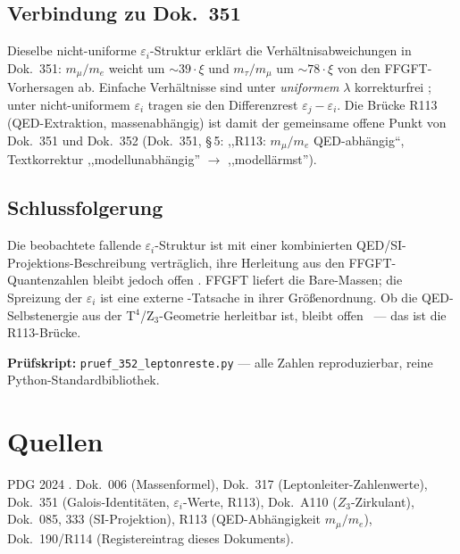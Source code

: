\subsection*{Verbindung zu Dok.~351}

Dieselbe nicht-uniforme $\varepsilon_i$-Struktur erklärt die Verhältnisabweichungen
in Dok.~351: $m_\mu/m_e$ weicht um $\sim 39\cdot\xi$ und $m_\tau/m_\mu$ um $\sim 78\cdot\xi$
von den FFGFT-Vorhersagen ab. Einfache Verhältnisse sind unter \emph{uniformem}
$\lambda$ korrekturfrei \BM; unter nicht-uniformem $\varepsilon_i$ tragen sie
den Differenzrest $\varepsilon_j - \varepsilon_i$. Die Brücke R113 (QED-Extraktion,
massenabhängig) ist damit der gemeinsame offene Punkt von Dok.~351 und Dok.~352
(Dok.~351, §\,5: ,,R113: $m_\mu/m_e$ QED-abhängig``, Textkorrektur ,,modellunabhängig''
$\to$ ,,modellärmst'').

\subsection*{Schlussfolgerung}

Die beobachtete fallende $\varepsilon_i$-Struktur ist mit einer kombinierten
QED/SI-Projektions-Beschreibung verträglich, ihre Herleitung aus den
FFGFT-Quantenzahlen bleibt jedoch offen \SM. FFGFT liefert die Bare-Massen; die
Spreizung der $\varepsilon_i$ ist eine externe \QM-Tatsache in ihrer Größenordnung.
Ob die QED-Selbstenergie aus der T$^4$/Z$_3$-Geometrie herleitbar ist, bleibt offen
\SM\ --- das ist die R113-Brücke.

\bigskip\noindent
\textbf{Prüfskript:}
\texttt{pruef\_352\_leptonreste.py} --- alle Zahlen reproduzierbar, reine Python-Standardbibliothek.

\section*{Quellen}

PDG 2024 \QM. Dok.~006 (Massenformel), Dok.~317 (Leptonleiter-Zahlenwerte),
Dok.~351 (Galois-Identitäten, $\varepsilon_i$-Werte, R113), Dok.~A110
($Z_3$-Zirkulant), Dok.~085, 333 (SI-Projektion), R113 (QED-Abhängigkeit
$m_\mu/m_e$), Dok.~190/R114 (Registereintrag dieses Dokuments).
